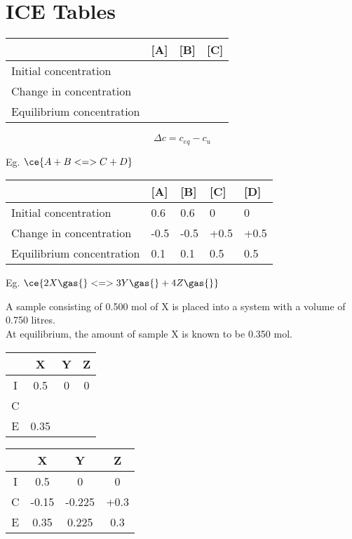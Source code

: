 \section{ICE Tables} \label{6/11/2024}
	\begin{table}[htbp]
		\centering
		\begin{tabular}{|l|l|l|l|}
			\hline
			 & [A] & [B] & [C] \\ \hline
			Initial concentration &  &  &  \\
			Change in concentration &  &  &  \\
			Equilibrium concentration &  &  &  \\ \hline
		\end{tabular}
	\end{table}

	$$\Delta c = c_{eq}- c_{u}$$

	Eg. $\ce{A + B <=> C + D}$

	\begin{table}[htbp]
		\centering
		\begin{tabular}{lllll}
			\hline
			 & [A] & [B] & [C] & [D]  \\ \hline
			Initial concentration 		& 0.6 & 0.6 & 0 & 0 \\
			Change in concentration 	& -0.5 & -0.5 & +0.5 & +0.5 \\
			Equilibrium concentration 	& 0.1 & 0.1 & 0.5 & 0.5 \\ \hline
		\end{tabular}
	\end{table}

	Eg. $\ce{2X \gas{} <=> 3Y \gas{} + 4Z \gas{}}$

	A sample consisting of 0.500 mol of X is placed into a system with a volume of 0.750 litres. \\
	At equilibrium, the amount of sample X is known to be 0.350 mol.

	\begin{table}[htbp]
		\centering
		\begin{tabular}{cccc}
			\hline
			 & X & Y & Z \\ \hline
			I 		& 0.5 & 0 & 0 \\
			C 		&  &  & \\
			E 		& 0.35 &  &  \\ \hline
		\end{tabular}
	\end{table}

	\begin{table}[htbp]
		\centering
		\begin{tabular}{cccc}
			\hline
			 	& X & Y & Z \\ \hline
			I 		& 0.5 & 0 & 0 \\
			C 		& -0.15 & -0.225 & +0.3 \\
			E 		& 0.35 & 0.225 & 0.3 \\ \hline
		\end{tabular}
	\end{table}

